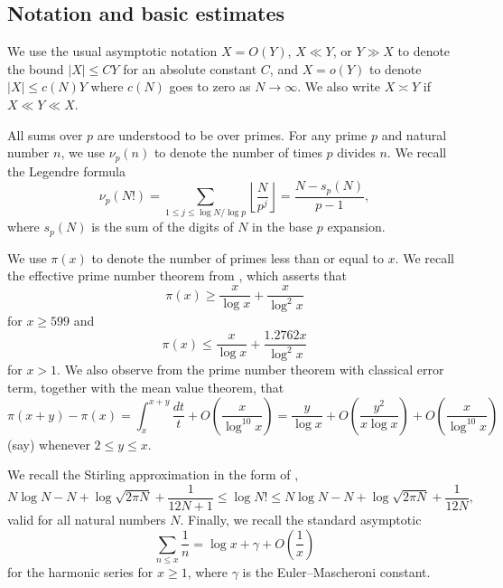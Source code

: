 \documentclass[12pt,a4paper,reqno]{amsart}
\numberwithin{equation}{section}
\theoremstyle{plain}
\theoremstyle{definition}
\begin{document}
\subsection{Notation and basic estimates}

We use the usual asymptotic notation $X=O(Y)$, $X \ll Y$, or $Y \gg X$ to denote the bound $|X| \leq CY$ for an absolute constant $C$, and $X=o(Y)$ to denote $|X| \leq c(N) Y$ where $c(N)$ goes to zero as $N \to \infty$. We also write $X \asymp Y$ if $X \ll Y \ll X$.

All sums over $p$ are understood to be over primes.
For any prime $p$ and natural number $n$, we use $\nu_p(n)$ to denote the number of times $p$ divides $n$.  We recall the Legendre formula
\begin{equation}\label{legendre}
  \nu_p(N!) = \sum_{1 \leq j \leq \log N / \log p} \left\lfloor \frac{N}{p^j} \right\rfloor = \frac{N-s_p(N)}{p-1},
\end{equation}
where $s_p(N)$ is the sum of the digits of $N$ in the base $p$ expansion.

We use $\pi(x)$ to denote the number of primes less than or equal to $x$.  We recall the effective prime number theorem from \cite[Corollary 5.2]{dusart}, which asserts that
\begin{equation}\label{pi-lower}
  \pi(x) \geq \frac{x}{\log x} + \frac{x}{\log^2 x}
\end{equation}
for $x \geq 599$ and
\begin{equation}\label{pi-upper}
  \pi(x) \leq \frac{x}{\log x} + \frac{1.2762 x}{\log^2 x}
\end{equation}
for $x >1$.  We also observe from the prime number theorem with classical error term, together with the mean value theorem, that
\begin{equation}\label{pixy}
  \pi(x+y) - \pi(x) = \int_x^{x+y} \frac{dt}{t} + O\left( \frac{x}{\log^{10} x} \right) = \frac{y}{\log x} + O\left( \frac{y^2}{x \log x} \right) + O\left( \frac{x}{\log^{10} x} \right)
  \end{equation}
(say) whenever $2 \leq y \leq x$.

We recall the Stirling approximation in the form of \cite{robbins},
\begin{equation}\label{stirling}
  N \log N - N + \log \sqrt{2\pi N} + \frac{1}{12N+1} \leq \log N! \leq N \log N - N + \log \sqrt{2\pi N} + \frac{1}{12N},
\end{equation}
valid for all natural numbers $N$.  Finally, we recall the standard asymptotic
\begin{equation}\label{harm}
  \sum_{n \leq x} \frac{1}{n} = \log x + \gamma + O\left(\frac{1}{x}\right)
  \end{equation}
for the harmonic series for $x \geq 1$, where $\gamma$ is the Euler--Mascheroni constant.
\end{document}
